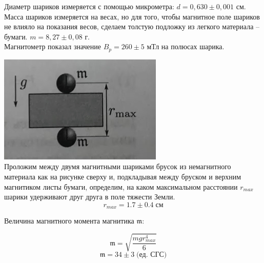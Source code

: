 \documentclass[a4paper,12pt]{article}
\begin{document}
Диаметр шариков измеряется с помощью микрометра: $d = 0,630 \pm 0,001 $ см. \\
Масса шариков измеряется на весах, но для того, чтобы магнитное поле шариков не влияло на показания весов, сделаем толстую подложку из легкого материала -- бумаги. $m = 8,27 \pm 0,08 $ г. \\
Магнитометр показал значение $B_{p} = 260 \pm 5 $ мТл на полюсах шарика.
\begin{center}
\begin{minipage}{0.4\textwidth}
 \includegraphics[width=\linewidth]{1.jpg}\\
Проложим между двумя магнитными шариками брусок из немагнитного материала как на рисунке сверху и, подкладывая между бруском и верхним магнитиком листы бумаги, определим, на каком максимальном расстоянии $r_{max}$ шарики удерживают друг друга в поле тяжести Земли. \[r_{max} = 1.7 \pm 0.4 \; \text{см}\]

Величина магнитного момента магнитика $\mathfrak{m}$:

\[ \mathfrak{m} = \sqrt{\frac{mgr^4_{max}}{6}} \]
\[ \mathfrak{m} = 34 \pm 3 \; \text{(ед. СГС)} \]


\end{minipage}
\end{center}
\end{document}
